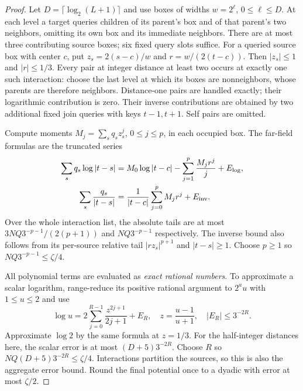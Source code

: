 \documentclass[11pt]{article}
\theoremstyle{definition}
\begin{document}
\begin{proof}
Let $D=\lceil\log_2(L+1)\rceil$ and use boxes of widths $w=2^\ell$,
$0\le\ell\le D$. At each level a target queries children of its parent's
box and of that parent's two neighbors, omitting its own box and its
immediate neighbors. There are at most three contributing source boxes;
six fixed query slots suffice. For a queried source box with center $c$,
put $z_s=2(s-c)/w$ and $r=w/(2(t-c))$. Then $|z_s|\le1$ and $|r|\le1/3$.
Every pair at integer distance at least two occurs at exactly one such
interaction: choose the last level at which its boxes are nonneighbors,
whose parents are therefore neighbors. Distance-one pairs are handled
exactly; their logarithmic contribution is zero. Their inverse contributions
are obtained by two additional fixed join queries with keys $t-1,t+1$.
Self pairs are omitted.

Compute moments $M_j=\sum_s q_sz_s^j$, $0\le j\le p$, in each occupied
box. The far-field formulas are the truncated series
\begin{align*}
 \sum_s q_s\log|t-s|
  &=M_0\log|t-c|-\sum_{j=1}^{p}\frac{M_jr^j}{j}+E_{\log},\\
 \sum_s\frac{q_s}{|t-s|}
  &=\frac1{|t-c|}\sum_{j=0}^{p}M_jr^j+E_{\rm inv}.
\end{align*}
Over the whole interaction list, the absolute tails are at most
$3NQ3^{-p-1}/(2(p+1))$ and $NQ3^{-p-1}$ respectively. The inverse bound
also follows from its per-source relative tail $|rz_s|^{p+1}$ and
$|t-s|\ge1$. Choose $p\ge1$ so $NQ3^{-p-1}\le\zeta/4$.

All polynomial terms are evaluated as \emph{exact rational numbers}.
To approximate a scalar logarithm, range-reduce its positive rational
argument to $2^a u$ with $1\le u\le2$ and use
\[
 \log u=2\sum_{j=0}^{R-1}\frac{z^{2j+1}}{2j+1}+E_R,
 \quad z=\frac{u-1}{u+1},\quad |E_R|\le3^{-2R}.
\]
Approximate $\log2$ by the same formula at $z=1/3$.
For the half-integer distances here, the scalar error is at most
$(D+5)3^{-2R}$. Choose $R$ so
$NQ(D+5)3^{-2R}\le\zeta/4$. Interactions partition the sources, so this
is also the aggregate error bound. Round the final potential once to a
dyadic with error at most $\zeta/2$.


\end{proof}
\end{document}
